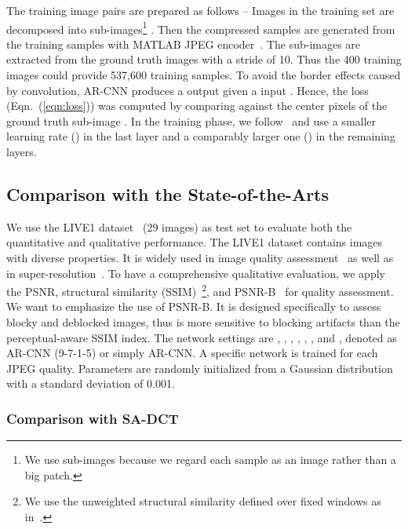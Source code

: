 \documentclass[10pt,twocolumn,letterpaper]{article}
\begin{document}
The training image pairs  are prepared as follows -- Images in the training set are decomposed into  sub-images\footnote{We use sub-images because we regard each sample as an image rather than a big patch.} . Then the compressed samples  are generated from the training samples with MATLAB JPEG encoder~\cite{Jancsary2012}. The sub-images are extracted from the ground truth images with a stride of 10. Thus the 400 training images could provide 537,600 training samples. To avoid the border effects caused by convolution, AR-CNN produces a  output given a  input . Hence, the loss (Eqn.~(\ref{eqn:loss})) was computed by comparing against the center  pixels of the ground truth sub-image .
In the training phase, we follow~\cite{Jain2009,Dong2014} and use a smaller learning rate () in the last layer and a comparably larger one () in the remaining layers.

\subsection{Comparison with the State-of-the-Arts}

We use the LIVE1 dataset~\cite{Sheikh2005} (29 images) as test set to evaluate both the quantitative and qualitative performance. The LIVE1 dataset contains images with diverse properties. It is widely used in image quality assessment~\cite{Wang2004} as well as in super-resolution~\cite{Yang2014}.
To have a comprehensive qualitative evaluation, we apply the PSNR, structural similarity (SSIM)~\cite{Wang2004}\footnote{We use the unweighted structural similarity defined over fixed  windows as in~\cite{Wang2008}.}, and PSNR-B~\cite{Yim2011} for quality assessment. We want to emphasize the use of PSNR-B. It is designed specifically to assess blocky and deblocked images, thus is more sensitive to blocking artifacts than the perceptual-aware SSIM index.
The network settings are , , , , , ,  and , denoted as AR-CNN (9-7-1-5) or simply AR-CNN. A specific network is trained for each JPEG quality. Parameters are randomly initialized from a Gaussian distribution with a standard deviation of 0.001.


\subsubsection{Comparison with SA-DCT}
\end{document}
